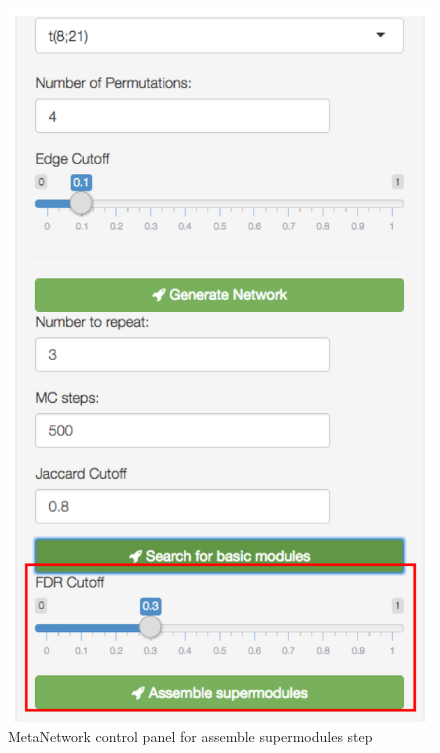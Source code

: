 \begin{steps}
\begin{figure}[H]
\begin{center}
\includegraphics[scale=0.45]{./figure/MetaNetwork/MetaNetworkstep3}
\caption{MetaNetwork control panel for assemble supermodules step}
\label{fig:MetaNetworkstep3}
\end{center}
\end{figure}



\end{steps}

